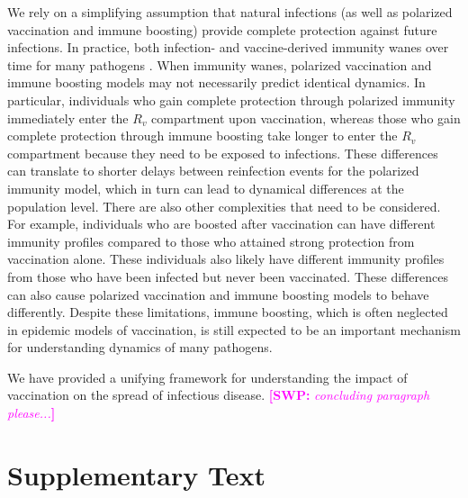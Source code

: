 \documentclass[12pt]{article}
\newcommand{\comment}{\showcomment}
\newcommand{\showcomment}[3]{\textcolor{#1}{\textbf{[#2: }\textsl{#3}\textbf{]}}}
\newcommand{\swp}[1]{\comment{magenta}{SWP}{#1}}
\begin{document}
We rely on a simplifying assumption that natural infections (as well as polarized vaccination and immune boosting) provide complete protection against future infections.
In practice, both infection- and vaccine-derived immunity wanes over time for many pathogens \citep{heffernan2009implications,lewnard2018vaccine,perez2022}.
When immunity wanes, polarized vaccination and immune boosting models may not necessarily predict identical dynamics.
In particular, individuals who gain complete protection through polarized immunity immediately enter the $R_v$ compartment upon vaccination, whereas those who gain complete protection through immune boosting take longer to enter the $R_v$ compartment because they need to be exposed to infections.
These differences can translate to shorter delays between reinfection events for the polarized immunity model, which in turn can lead to dynamical differences at the population level.
There are also other complexities that need to be considered.
For example, individuals who are boosted after vaccination can have different immunity profiles compared to those who attained strong protection from vaccination alone.
These individuals also likely have different immunity profiles from those who have been infected but never been vaccinated.
These differences can also cause polarized vaccination and immune boosting models to behave differently.
Despite these limitations, immune boosting, which is often neglected in epidemic models of vaccination, is still expected to be an important mechanism for understanding dynamics of many pathogens.

We have provided a unifying framework for understanding the impact of vaccination on the spread of infectious disease.
\swp{concluding paragraph please...}

\pagebreak

\section*{Supplementary Text}
\end{document}
